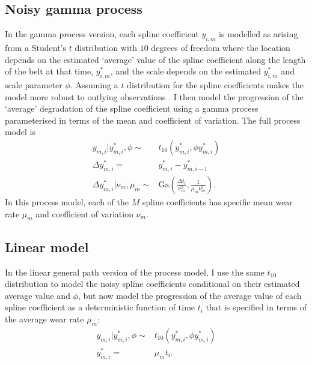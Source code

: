 \subsection{Noisy gamma process} \label{subsec:belt-wear-gp}
In the gamma process version, each spline coefficient $y_{i,m}$ is modelled as arising from a Student's $t$ distribution with $10$ degrees of freedom where the location depends on the estimated `average' value of the spline coefficient along the length of the belt at that time, $y^*_{i,m}$, and the scale depends on the estimated $y^*_{i,m}$ and scale parameter $\phi$. Assuming a $t$ distribution for the spline coefficients makes the model more robust to outlying observations \citep[Chap.~17]{BDA2020}. I then model the progression of the `average' degradation of the spline coefficient using a gamma process parameterised in terms of the mean and coefficient of variation. The full process model is
\begin{align*}
  y_{m, i}|y^*_{m, i}, \phi      \sim & t_{10}\left(y^*_{m, i}, \phi y^*_{m, i}\right)                       \\
  \Delta  y^*_{m, i}                = & y^*_{m, i} - y^*_{m, i-1}                                                   \\
  \Delta y^*_{m, i}|\nu_m, \mu_m \sim & \mbox{Ga}\left( \frac{\Delta t_i}{\nu_m^2}, \frac{1}{\mu_m \nu_m^2} \right).
\end{align*}
In this process model, each of the $M$ spline coefficients has specific mean wear rate $\mu_m$ and coefficient of variation $\nu_m$.

\subsection{Linear model} \label{subsec:belt-wear-gp}
In the linear general path version of the process model, I use the same $t_{10}$ distribution to model the noisy spline coefficients conditional on their estimated average value and $\phi$, but now model the progression of the average value of each spline coefficient as a deterministic function of time $t_i$ that is specified in terms of the average wear rate $\mu_m$:
\begin{align*}
  y_{m, i}|y^*_{m, i}, \phi \sim & t_{10}\left(y^*_{m, i}, \phi y^*_{m, i}\right)  \\
  y^*_{m, i}                   = & \mu_m t_{i}.
\end{align*}

